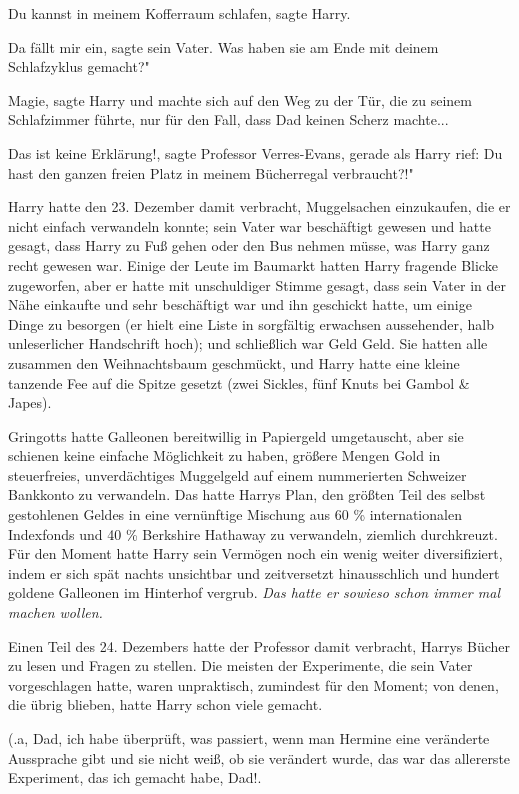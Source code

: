 \glqq Du kannst in meinem Kofferraum schlafen\grqq{}, sagte Harry.

\glqq Da fällt mir ein\grqq{}, sagte sein Vater. \glqq Was haben sie am Ende mit
deinem Schlafzyklus gemacht?"

\glqq Magie\grqq{}, sagte Harry und machte sich auf den Weg zu der Tür, die zu
seinem Schlafzimmer führte, nur für den Fall, dass Dad keinen Scherz machte...

\glqq Das ist keine Erklärung!\grqq{}, sagte Professor Verres-Evans, gerade als
Harry rief: \glqq Du hast den ganzen freien Platz in meinem Bücherregal
verbraucht?!"

Harry hatte den 23. Dezember damit verbracht, Muggelsachen einzukaufen, die er
nicht einfach verwandeln konnte; sein Vater war beschäftigt gewesen und hatte
gesagt, dass Harry zu Fuß gehen oder den Bus nehmen müsse, was Harry ganz recht
gewesen war. Einige der Leute im Baumarkt hatten Harry fragende Blicke
zugeworfen, aber er hatte mit unschuldiger Stimme gesagt, dass sein Vater in der
Nähe einkaufte und sehr beschäftigt war und ihn geschickt hatte, um einige Dinge
zu besorgen (er hielt eine Liste in sorgfältig erwachsen aussehender, halb
unleserlicher Handschrift hoch); und schließlich war Geld Geld. Sie hatten alle
zusammen den Weihnachtsbaum geschmückt, und Harry hatte eine kleine tanzende Fee
auf die Spitze gesetzt (zwei Sickles, fünf Knuts bei Gambol \& Japes).

Gringotts hatte Galleonen bereitwillig in Papiergeld umgetauscht, aber sie
schienen keine einfache Möglichkeit zu haben, größere Mengen Gold in
steuerfreies, unverdächtiges Muggelgeld auf einem nummerierten Schweizer
Bankkonto zu verwandeln. Das hatte Harrys Plan, den größten Teil des selbst
gestohlenen Geldes in eine vernünftige Mischung aus 60 \% internationalen
Indexfonds und 40 \% Berkshire Hathaway zu verwandeln, ziemlich durchkreuzt. Für
den Moment hatte Harry sein Vermögen noch ein wenig weiter diversifiziert, indem
er sich spät nachts unsichtbar und zeitversetzt hinausschlich und hundert
goldene Galleonen im Hinterhof vergrub.
\emph{ Das hatte er sowieso schon immer mal machen wollen. }

Einen Teil des 24. Dezembers hatte der Professor damit verbracht, Harrys Bücher
zu lesen und Fragen zu stellen. Die meisten der Experimente, die sein Vater
vorgeschlagen hatte, waren unpraktisch, zumindest für den Moment; von denen, die
übrig blieben, hatte Harry schon viele gemacht.

(\grqq{}.a, Dad, ich habe überprüft, was passiert, wenn man Hermine eine
veränderte Aussprache gibt und sie nicht weiß, ob sie verändert wurde, das war
das allererste Experiment, das ich gemacht habe, Dad!\grqq{}.

